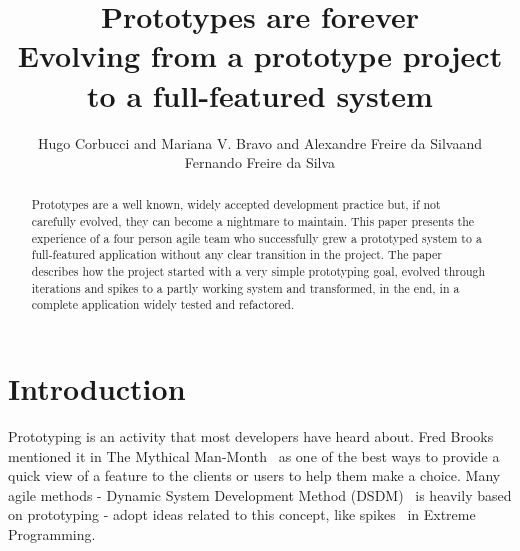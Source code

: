 \documentclass[lnbip]{svmultln}
\begin{document}
%
\mainmatter %
%
\title{Prototypes are forever\\
  Evolving from a prototype project\\ to a full-featured system}
%
%
\author{Hugo Corbucci and Mariana V. Bravo  and
  Alexandre Freire da Silvaand Fernando Freire da
  Silva}
%
%
%

\maketitle %

\begin{abstract} %
  Prototypes are a well known, widely accepted development practice
  but, if not carefully evolved, they can become a nightmare to
  maintain. This paper presents the experience of a four person agile
  team who successfully grew a prototyped system to a full-featured
  application without any clear transition in the project. The paper
  describes how the project started with a very simple prototyping
  goal, evolved through iterations and spikes to a partly working
  system and transformed, in the end, in a complete application widely
  tested and refactored.

\end{abstract}
%
\section{Introduction}

Prototyping is an activity that most developers have heard about. Fred
Brooks mentioned it in The Mythical Man-Month~\cite{Brooks1975} as one
of the best ways to provide a quick view of a feature to the clients
or users to help them make a choice. Many agile methods - Dynamic
System Development Method (DSDM)~\cite{DSDM} is heavily based on
prototyping - adopt ideas related to this concept, like
spikes~\cite{XP} in Extreme Programming.
\end{document}
